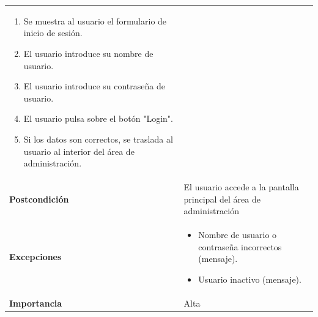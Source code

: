\documentclass[
]{article}
\providecommand{\tightlist}{%
  \setlength{\itemsep}{0pt}\setlength{\parskip}{0pt}}
\begin{document}
\begin{longtable}[]{@{}ll@{}}
\begin{minipage}[t]{0.74\columnwidth}
\begin{enumerate}
\def\labelenumi{\arabic{enumi}.}
\tightlist
\item
  Se muestra al usuario el formulario de inicio de sesión.
\item
  El usuario introduce su nombre de usuario.
\item
  El usuario introduce su contraseña de usuario.
\item
  El usuario pulsa sobre el botón "Login".
\item
  Si los datos son correctos, se traslada al usuario al interior del
  área de administración.
\end{enumerate}\strut
\end{minipage}\tabularnewline
\begin{minipage}[t]{0.20\columnwidth}\raggedright
\textbf{Postcondición}\strut
\end{minipage} & \begin{minipage}[t]{0.74\columnwidth}\raggedright
El usuario accede a la pantalla principal del área de
administración\strut
\end{minipage}\tabularnewline
\begin{minipage}[t]{0.20\columnwidth}\raggedright
\textbf{Excepciones}\strut
\end{minipage} & \begin{minipage}[t]{0.74\columnwidth}\raggedright
\begin{itemize}
\tightlist
\item
  Nombre de usuario o contraseña incorrectos (mensaje).
\item
  Usuario inactivo (mensaje).
\end{itemize}\strut
\end{minipage}\tabularnewline
\begin{minipage}[t]{0.20\columnwidth}\raggedright
\textbf{Importancia}\strut
\end{minipage} & \begin{minipage}[t]{0.74\columnwidth}\raggedright
Alta\strut
\end{minipage}\tabularnewline
\bottomrule
\end{longtable}
\end{document}
